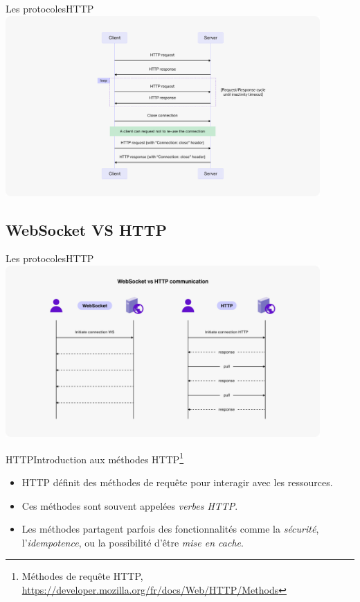 \documentclass{beamer}
\begin{document}
    \begin{frame}{Les protocoles}{HTTP\label{sendbird-protocole}}
        \centering
        \includegraphics[width=12cm]{image/Tutorial-HTTP-connection-chart}
    \end{frame}

    \subsection{WebSocket VS HTTP}\label{subsec:ws-vs-http}

    \begin{frame}{Les protocoles}{HTTP\label{sendbird-protocole}}
        \centering
        \includegraphics[width=12cm]{image/Tutorial-WebSocket-vs.-HTTP-communication-diagram}
    \end{frame}

    \begin{frame}{HTTP}{Introduction aux méthodes HTTP\footnote{\label{mozilla-http-methods}Méthodes de requête HTTP, \url{https://developer.mozilla.org/fr/docs/Web/HTTP/Methods}}}
        \begin{itemize}
            \item HTTP définit des méthodes de requête pour interagir avec les ressources.
            \item Ces méthodes sont souvent appelées \textit{verbes HTTP}.
            \item Les méthodes partagent parfois des fonctionnalités comme la \textit{sécurité}, l'\textit{idempotence}, ou la possibilité d'être \textit{mise en cache}.
        \end{itemize}
    \end{frame}
\end{document}

